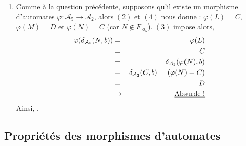 \documentclass{article}
\begin{document}
\begin{enumerate}
    \item Comme à la question précédente, supposons qu'il existe un morphisme d'automates $\varphi  : \mathcal{A}_5 \rightarrow \mathcal{A}_2$, alors $(2)$ et $(4)$ nous donne : $\varphi(L) = C$, $\varphi(M) = D$ et $\varphi(N) = C$ (car $N \notin F_{\mathcal{A}_5}$). $(3)$ impose alors, 
    \begin{eqnarray*}
        \varphi(\delta_{\mathcal{A}_5}(N, b)) & = & \varphi(L) \\
        & = & C \\
        & = & \delta_{\mathcal{A}_2}(\varphi(N), b) \\
        & = & \delta_{\mathcal{A}_2}(C, b) \hspace{5mm} (\varphi(N) = C) \\
        & = & D \\
        & \rightarrow & \text{\underline{Absurde !}}
    \end{eqnarray*}
    Ainsi, .

\end{enumerate}

\subsection{Propri\'et\'es des morphismes d'automates}
\end{document}
